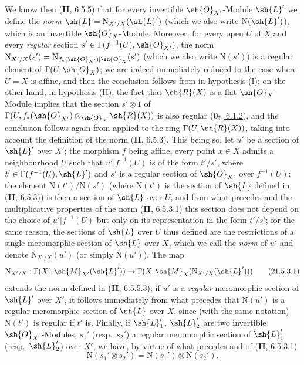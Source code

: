\begin{env}[21.5.3]
We know then (\textbf{II}, 6.5.5) that for every invertible $\sh{O}_{X'}$-Module $\sh{L}'$ we define the \emph{norm} $\sh{L}=\mathrm{N}_{X'/X}(\sh{L}')$ (which we also write $\mathrm{N}(\sh{L}')$), which is an invertible $\sh{O}_X$-Module.
Moreover, for every open $U$ of $X$ and every \emph{regular} section $s'\in\Gamma(f^{-1}(U),\sh{O}_{X'})$, the norm $\mathrm{N}_{X'/X}(s')=\mathrm{N}_{f_*(\sh{O}_{X'})|\sh{O}_X}(s')$ (which we also write $\mathrm{N}(s')$) is a regular element of $\Gamma(U,\sh{O}_X)$;
we are indeed immediately reduced to the case where $U=X$ is affine, and then the conclusion follows from  in hypothesis (I);
on the other hand, in hypothesis (II), the fact that $\sh{R}(X)$ is a flat $\sh{O}_X$-Module implies that the section $s'\otimes 1$ of $\Gamma(U,f_*(\sh{O}_{X'})\otimes_{\sh{O}_X}\sh{R}(X))$ is also regular (\hyperref[0.6.1.2]{$\mathbf{0_I}$, 6.1.2}), and the conclusion follows again from  applied to the ring $\Gamma(U,\sh{R}(X))$, taking into account the definition of the norm (\textbf{II}, 6.5.3).
This being so, let $u'$ be a section of $\sh{L}'$ over $X'$;
the morphism $f$ being affine, every point $x\in X$ admits a neighbourhood $U$ such that $u'|f^{-1}(U)$ is of the form $t'/s'$, where $t'\in\Gamma(f^{-1}(U),\sh{L}')$ and $s'$ is a regular section of $\sh{O}_{X'}$ over $f^{-1}(U)$;
the element $\mathrm{N}(t')/\mathrm{N}(s')$ (where $\mathrm{N}(t')$ is the section of $\sh{L}$ defined in (\textbf{II}, 6.5.3)) is then a section of $\sh{L}$ over $U$, and from what precedes and the multiplicative properties of the norm (\textbf{II}, 6.5.3.1) this section does not depend on the choice of $u'|f^{-1}(U)$ but only on its representation in the form $t'/s'$;
for the same reason, the sections of $\sh{L}$ over $U$ thus defined are the restrictions of a single meromorphic section of $\sh{L}$ over $X$, which we call the \emph{norm} of $u'$ and denote $\mathrm{N}_{X'/X}(u')$ (or simply $\mathrm{N}(u')$).
The map
\[
\label{IV.21.5.3.1}
  \mathrm{N}_{X'/X}:\Gamma(X',\sh{M}_{X'}(\sh{L}'))\to\Gamma(X,\sh{M}_X(\mathrm{N}_{X'/X}(\sh{L}')))
  \tag{21.5.3.1}
\]
extends the norm defined in (\textbf{II}, 6.5.5.3);
if $u'$ is a \emph{regular} meromorphic section of $\sh{L}'$ over $X'$, it follows immediately from what precedes that $\mathrm{N}(u')$ is a regular meromorphic section of $\sh{L}$ over $X$, since (with the same notation) $\mathrm{N}(t')$ is regular if $t'$ is.
Finally, if $\sh{L}_1'$, $\sh{L}_2'$ are two invertible $\sh{O}_{X'}$-Modules, $s_1'$ (resp.\ $s_2'$) a regular meromorphic section of $\sh{L}_1'$ (resp.\ $\sh{L}_2'$) over $X'$, we have, by virtue of what precedes and of (\textbf{II}, 6.5.3.1)
\[
\label{IV.21.5.3.2}
  \mathrm{N}(s_1'\otimes s_2')=\mathrm{N}(s_1')\otimes\mathrm{N}(s_2').
  \tag{21.5.3.2}
\]
\end{env}

